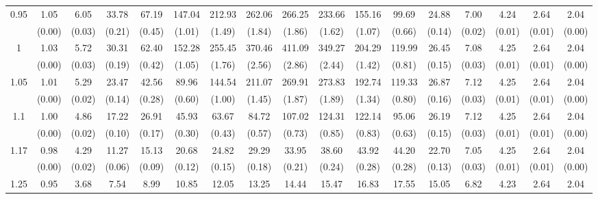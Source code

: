 \documentclass[12pt]{article}  %
\theoremstyle{plain}
\begin{document}
\begin{sidewaystable}[htbp]
\begin{tabular}{ccccccccccccccccc}
\multirow{2}{*}{0.95}  & 1.05& 6.05& 33.78& 67.19& 147.04& 212.93& 262.06& 266.25& 233.66 &155.16 & 99.69 &24.88 & 7.00 & 4.24 &2.64 & 2.04 \\                
					  & (0.00)& (0.03)& (0.21)& (0.45)& (1.01)& (1.49)& (1.84)& (1.86)& (1.62)&  (1.07)&  (0.66)&  (0.14)&  (0.02)&  (0.01)&  (0.01) &    (0.00)\\ \hline
\multirow{2}{*}{1}  & 1.03& 5.72& 30.31& 62.40& 152.28 &255.45& 370.46& 411.09 &349.27 &204.29 &119.99 &26.45  &7.08 & 4.25  &2.64 & 2.04\\
                      & (0.00)& (0.03)& (0.19)& (0.42)& (1.05)& (1.76)& (2.56)& (2.86)& (2.44)&  (1.42)&  (0.81)&  (0.15)&  (0.03)&  (0.01)&  (0.01) &     (0.00)\\ \hline                                                                     
\multirow{2}{*}{1.05}  & 1.01 &5.29 &23.47 &42.56 & 89.96 &144.54& 211.07 &269.91& 273.83 &192.74 &119.33 &26.87 & 7.12 & 4.25 & 2.64 & 2.04\\
                      & (0.00)& (0.02)& (0.14)& (0.28)& (0.60)& (1.00)& (1.45)& (1.87)& (1.89)&  (1.34)&  (0.80)&  (0.16)&  (0.03)&  (0.01)&  (0.01)  &     (0.00)\\ \hline                                                                                                                                          
\multirow{2}{*}{1.1}  &1.00 &4.86 &17.22 &26.91 & 45.93 & 63.67 & 84.72 &107.02 &124.31 &122.14 & 95.06 &26.19 & 7.12 & 4.25&  2.64 & 2.04\\
                      &  (0.00)& (0.02)& (0.10)& (0.17)& (0.30)& (0.43)& (0.57)& (0.73)& (0.85)&  (0.83)&  (0.63)&  (0.15)&  (0.03)&  (0.01)&  (0.01) &     (0.00)\\ \hline
\multirow{2}{*}{1.17}  &0.98 &4.29& 11.27& 15.13 & 20.68 & 24.82 & 29.29 & 33.95 & 38.60 & 43.92 & 44.20& 22.70 & 7.05 & 4.25 & 2.64 & 2.04\\
                      & (0.00) &(0.02)& (0.06)& (0.09)& (0.12)& (0.15)& (0.18)& (0.21)& (0.24)&  (0.28)&  (0.28)&  (0.13)&  (0.03)&  (0.01)&  (0.01)  &   (0.00)\\ \hline                                                                                                                                                                                                                                                                                    
                                                                     \multirow{2}{*}{1.25}  &0.95& 3.68 & 7.54 & 8.99 & 10.85 & 12.05 & 13.25 & 14.44 & 15.47  &16.83 & 17.55& 15.05 & 6.82 & 4.23 & 2.64 & 2.04\\

\end{tabular}
\end{sidewaystable}
\end{document}
